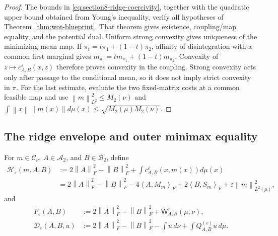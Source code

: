 \documentclass[11pt]{article}
\newcommand{\ip}[2]{\left\langle #1,#2\right\rangle}
\newcommand{\norm}[1]{\left\lVert #1\right\rVert}
\theoremstyle{plain}
\theoremstyle{definition}
\theoremstyle{remark}
\begin{document}
\begin{proof}
The bounds in \eqref{eq:section8-ridge-coercivity}, together with the quadratic
upper bound obtained from Young's inequality, verify all hypotheses of
Theorem~\ref{thm:wot-blueprint}. That theorem gives existence, coupling/map
equality, and the potential dual. Uniform strong convexity gives uniqueness of
the minimizing mean map. If \(\pi_t=t\pi_1+(1-t)\pi_2\), affinity of
disintegration with a common first marginal gives
\(m_{\pi_t}=tm_{\pi_1}+(1-t)m_{\pi_2}\). Convexity of
\(z\mapsto c_{A,B}^\varepsilon(x,z)\) therefore proves convexity in the coupling.
Strong convexity acts only after passage to the conditional mean, so it does not
imply strict convexity in \(\pi\). For the last estimate, evaluate the two fixed-matrix
costs at a common feasible map and use
\(\norm m_{L^2}^2\le M_2(\nu)\) and
\(\int\norm{x}\norm{m(x)}d\mu(x)
\le\sqrt{M_2(\mu)M_2(\nu)}\).
\end{proof}

\subsection{The ridge envelope and outer minimax equality}

For \(m\in\mathcal C_\nu\), \(A\in\mathcal A_2\), and
\(B\in\mathcal B_2\), define
\begin{equation}\label{eq:ridge-map-matrix-functional}
\begin{aligned}
 \mathcal H_\varepsilon(m,A,B)
 &:=2\norm A_F^2-\norm B_F^2
    +\int c_{A,B}^\varepsilon(x,m(x))d\mu(x)\\
 &=2\norm A_F^2-\norm B_F^2
   -4\ip{A}{M_m}_F+2\ip{B}{S_m}_F
   +\varepsilon\norm m_{L^2(\mu)}^2,
\end{aligned}
\end{equation}
and
\begin{equation}\label{eq:ridge-envelope-functionals}
\begin{aligned}
 F_\varepsilon(A,B)
 &:=2\norm A_F^2-\norm B_F^2+\mathsf W_{A,B}^\varepsilon(\mu,\nu),\\
 \mathcal D_\varepsilon(A,B,u)
 &:=2\norm A_F^2-\norm B_F^2-
   \int u\,d\nu+\int Q_{A,B}^{(\varepsilon)}u\,d\mu.
\end{aligned}
\end{equation}
\end{document}
